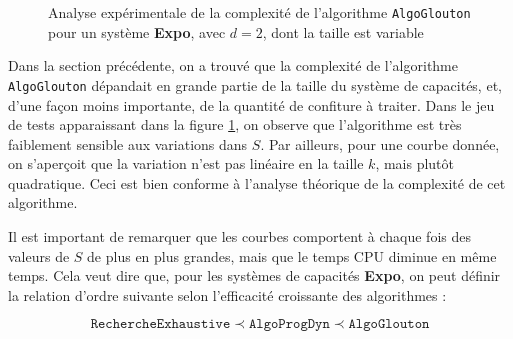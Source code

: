\documentclass[12pt,a4paper]{article}
\begin{document}
 \begin{figure}[!h]
  \centering
  \captionsetup{justification=centering}
  \caption[Analyse exp\'erimentale de \texttt{AlgoGlouton}]{Analyse exp\'erimentale de la complexit\'e de l'algorithme \texttt{AlgoGlouton} pour un syst\`eme {\bfseries Expo}, avec $d=2$, dont la taille est variable}
  \label{fig:comp_ga}
\end{figure}

\newpage

Dans la section pr\'ec\'edente, on a trouv\'e que la complexit\'e de l'algorithme \texttt{AlgoGlouton} d\'epandait en grande partie de la taille du syst\`eme de capacit\'es, et, d'une fa\c{c}on moins importante, de la quantit\'e de confiture \`a traiter. Dans le jeu de tests apparaissant dans la figure \ref{fig:comp_ga}, on observe que l'algorithme est tr\`es faiblement sensible aux variations dans $S$. Par ailleurs, pour une courbe donn\'ee, on s'aper\c{c}oit que la variation n'est pas lin\'eaire en la taille $k$, mais plut\^ot quadratique. Ceci est bien conforme \`a l'analyse th\'eorique de la complexit\'e de cet algorithme.

Il est important de remarquer que les courbes comportent \`a chaque fois des valeurs de $S$ de plus en plus grandes, mais que le temps CPU diminue en m\^eme temps. Cela veut dire que, pour les syst\`emes de capacit\'es {\bfseries Expo}, on peut d\'efinir la relation d'ordre suivante selon l'efficacit\'e croissante des algorithmes :

\begin{equation*}
  \texttt{RechercheExhaustive} \prec \texttt{AlgoProgDyn} \prec \texttt{AlgoGlouton}
\end{equation*}
\end{document}
